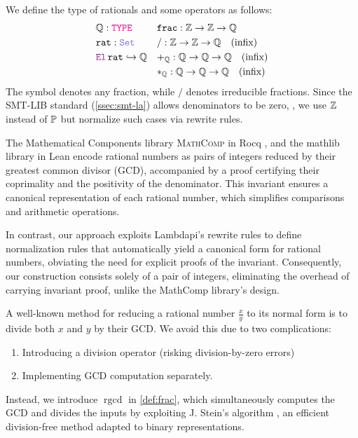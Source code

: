 \begin{definition}[Rational]\label{def:rat}
We define the type of rationals and some operators as follows:
\begin{align*}
& \Q: \type            & &\kw{frac}: \Z \ra \Z \ra \Q \\
& \kw{rat}: \set       & &\slash: \Z \ra \Z \ra \Q \quad \text{(infix)} \\
& \el\,\kw{rat} \re \Q & &+_\Q : \Q \ra \Q \ra \Q \quad \text{(infix)}\\
&                      & &*_\Q : \Q \ra \Q \ra \Q \quad \text{(infix)}\\
\end{align*}
The symbol  denotes any fraction, while $\slash$ denotes irreducible fractions.
Since the SMT-LIB standard (\cref{ssec:smt-la}) allows denominators to be zero, , we use $\mathbb{Z}$ instead of $\mathbb{P}$ but normalize such cases via rewrite rules.
\end{definition}

The Mathematical Components library \textsc{MathComp} \cite{mathcomp}  in Rocq \cite{Rocq-refman}, and the mathlib library \cite{mathlib} in Lean \cite{lean4:2021} encode rational numbers as pairs of integers reduced by their greatest common divisor (GCD), accompanied by a proof certifying their coprimality and the positivity of the denominator.
This invariant ensures a canonical representation of each rational number, which simplifies comparisons and arithmetic operations.

In contrast, our approach exploits Lambdapi’s rewrite rules to define normalization rules that automatically yield a canonical form for rational numbers, obviating the need for explicit proofs of the invariant.
Consequently, our construction consists solely of a pair of integers, eliminating the overhead of carrying invariant proof, unlike the MathComp library’s design.

A well-known method for reducing a rational number $\frac{x}{y}$ to its normal form is to divide both $x$ and $y$ by their GCD.
We avoid this due to two complications:
\begin{enumerate}
\item Introducing a division operator (risking division-by-zero errors)
\item Implementing GCD computation separately.
\end{enumerate}
Instead, we introduce $\mathop{rgcd}$  in \cref{def:frac}, which simultaneously computes the GCD and divides the inputs by exploiting J. Stein's algorithm \cite{knuth}, an efficient division-free method adapted to binary representations.


